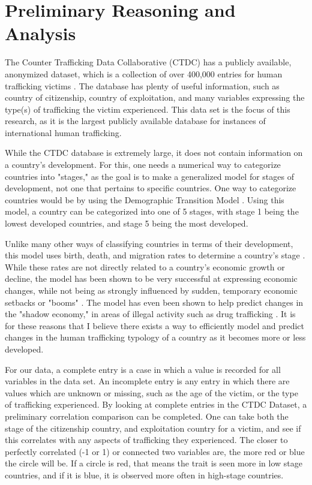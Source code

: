 \documentclass{article} %
\begin{document}
\section{Preliminary Reasoning and Analysis}

The Counter Trafficking Data Collaborative (CTDC) has a publicly available, anonymized dataset, which is a collection of over 400,000 entries for human trafficking victims \parencite{CTDC}. The database has plenty of useful information, such as country of citizenship, country of exploitation, and many variables expressing the type(s) of trafficking the victim experienced. This data set is the focus of this research, as it is the largest publicly available database for instances of international human trafficking.

While the CTDC database is extremely large, it does not contain information on a country's development. For this, one needs a numerical way to categorize countries into "stages," as the goal is to make a generalized model for stages of development, not one that pertains to specific countries. One way to categorize countries would be by using the Demographic Transition Model \parencite{bongaarts2009}. Using this model, a country can be categorized into one of 5 stages, with stage 1 being the lowest developed countries, and stage 5 being the most developed.

Unlike many other ways of classifying countries in terms of their development, this model uses birth, death, and migration rates to determine a country's stage \parencite{bongaarts2009}. While these rates are not directly related to a country's economic growth or decline, the model has been shown to be very successful at expressing economic changes, while not being as strongly influenced by sudden, temporary economic setbacks or "booms" \parencite{kirk1996,bar2010,galor2000}. The model has even been shown to help predict changes in the "shadow economy," in areas of illegal activity such as drug trafficking \parencite{sch1994}. It is for these reasons that I believe there exists a way to efficiently model and predict changes in the human trafficking typology of a country as it becomes more or less developed.

For our data, a complete entry is a case in which a value is recorded for all variables in the data set. An incomplete entry is any entry in which there are values which are unknown or missing, such as the age of the victim, or the type of trafficking experienced. By looking at complete entries in the CTDC Dataset, a preliminary correlation comparison can be completed. One can take both the stage of the citizenship country, and exploitation country for a victim, and see if this correlates with any aspects of trafficking they experienced. The closer to perfectly correlated (-1 or 1) or connected two variables are, the more red or blue the circle will be. If a circle is red, that means the trait is seen more in low stage countries, and if it is blue, it is observed more often in high-stage countries.
\end{document}
